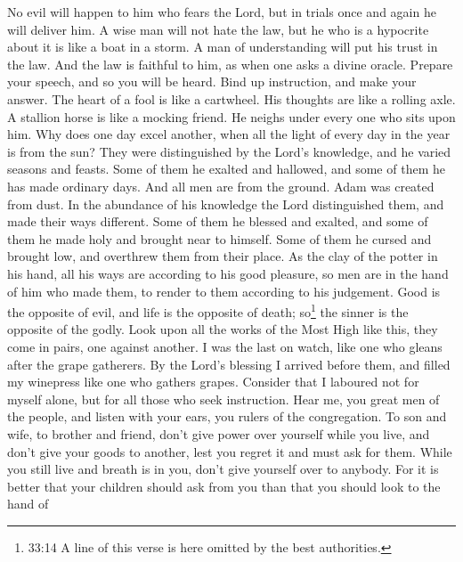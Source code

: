  No evil will happen to him who fears the Lord, but in
trials once and again he will deliver him.  A wise man will
not hate the law, but he who is a hypocrite about it is like a boat in a
storm.  A man of understanding will put his trust in the
law. And the law is faithful to him, as when one asks a divine oracle.
 Prepare your speech, and so you will be heard. Bind up
instruction, and make your answer.  The heart of a fool is
like a cartwheel. His thoughts are like a rolling axle.  A
stallion horse is like a mocking friend. He neighs under every one who
sits upon him.  Why does one day excel another, when all the
light of every day in the year is from the sun?  They were
distinguished by the Lord's knowledge, and he varied seasons and feasts.
 Some of them he exalted and hallowed, and some of them he
has made ordinary days.  And all men are from the ground.
Adam was created from dust.  In the abundance of his
knowledge the Lord distinguished them, and made their ways different.
 Some of them he blessed and exalted, and some of them he
made holy and brought near to himself. Some of them he cursed and
brought low, and overthrew them from their place.  As the
clay of the potter in his hand, all his ways are according to his good
pleasure, so men are in the hand of him who made them, to render to them
according to his judgement.  Good is the opposite of evil,
and life is the opposite of death; so\footnote{33:14 A line of this
  verse is here omitted by the best authorities.} the sinner is the
opposite of the godly.  Look upon all the works of the Most
High like this, they come in pairs, one against another.  I
was the last on watch, like one who gleans after the grape gatherers.
 By the Lord's blessing I arrived before them, and filled
my winepress like one who gathers grapes.  Consider that I
laboured not for myself alone, but for all those who seek instruction.
 Hear me, you great men of the people, and listen with your
ears, you rulers of the congregation.  To son and wife, to
brother and friend, don't give power over yourself while you live, and
don't give your goods to another, lest you regret it and must ask for
them.  While you still live and breath is in you, don't
give yourself over to anybody.  For it is better that your
children should ask from you than that you should look to the hand of
